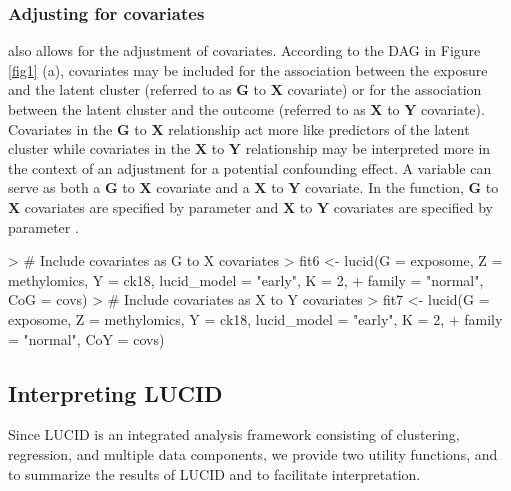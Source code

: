 \subsubsection{Adjusting for covariates} \label{sec3.1.3}
 also allows for the adjustment of covariates. According to the DAG in Figure \ref{fig1} (a), covariates may be included for the association between the exposure and the latent cluster (referred to as $\bm G$ to $\bm X$ covariate) or for the association between the latent cluster and the outcome (referred to as $\bm X$ to $\bm Y$ covariate). Covariates in the $\bm G$ to $\bm X$ relationship act more like predictors of the latent cluster while covariates in the $\bm X$ to $\bm Y$ relationship may be interpreted more in the context of an adjustment for a potential confounding effect. A variable can serve as both a $\bm G$ to $\bm X$ covariate and a $\bm X$ to $\bm Y$ covariate. In the  function, $\bm G$ to $\bm X$ covariates are specified by parameter  and $\bm X$ to $\bm Y$ covariates are specified by parameter .
\begin{example}
> # Include covariates as G to X covariates
> fit6 <- lucid(G = exposome, Z = methylomics, Y = ck18, lucid_model = "early", K = 2, 
+               family = "normal", CoG = covs)
> # Include covariates as X to Y covariates
> fit7 <- lucid(G = exposome, Z = methylomics, Y = ck18, lucid_model = "early", K = 2, 
+               family = "normal", CoY = covs)
\end{example}
\subsection{Interpreting LUCID} \label{section3.2}
Since LUCID is an integrated analysis framework consisting of clustering, regression, and multiple data components, we provide two utility functions,  and  to summarize the results of LUCID and to facilitate interpretation.
